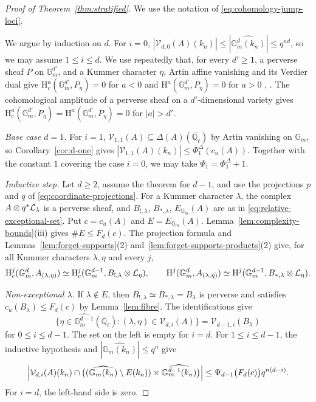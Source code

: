 \documentclass[12pt,reqno]{amsart}
\theoremstyle{definition}
\theoremstyle{plain}
\theoremstyle{definition}
\theoremstyle{remark}
\newcommand{\bbG}{\mathbb{G}}  \newcommand{\bbH}{\mathbb{H}}
\newcommand{\bbQ}{\mathbb{Q}}  \newcommand{\bbR}{\mathbb{R}}
\newcommand{\HH}{\mathrm{H}}  \newcommand{\JJ}{\mathrm{J}}
\newcommand{\ol}[1]{\overline{#1}}
\newcommand{\Ql}{\bbQ_{\ell}}
\newcommand{\Gm}{\bbG_m}
\newcommand{\cu}{c_u}
\begin{document}
\begin{proof}[Proof of Theorem~\ref{thm:stratified}]
We use the notation of \eqref{eq:cohomology-jump-loci}.

We argue by induction on \(d\).  For \(i=0\),
\(|\mathcal V_{d,0}(A)(k_n)|\le|\widehat{\Gm^d(k_n)}|\le q^{nd}\), so we may assume \(1\le i\le d\).  We use
repeatedly that, for every \(d'\ge1\), a perverse sheaf \(P\) on \(\Gm^{d'}\), and a Kummer character
\(\eta\), Artin affine vanishing and its Verdier dual give \(\HH^a_c(\Gm^{d'},P_\eta)=0\) for \(a<0\)
and \(\HH^a(\Gm^{d'},P_\eta)=0\) for \(a>0\) \cite[Th.~4.1.1, Cor.~4.1.2]{BBDG18},
\cite[Exp.~XIV, 3.1]{SGA4}.  The cohomological amplitude of a perverse sheaf on a \(d'\)-dimensional
variety gives \(\HH^a_c(\Gm^{d'},P_\eta)=\HH^a(\Gm^{d'},P_\eta)=0\) for \(|a|>d'\).

\emph{Base case \(d=1\).}  For \(i=1\),
\(\mathcal V_{1,1}(A)\subseteq\Delta(A)(\ol\Ql)\) by Artin vanishing on \(\Gm\), so
Corollary~\ref{cor:d-one} gives
\(|\mathcal V_{1,1}(A)(k_n)|\le\Phi^\Delta_{1}(\cu(A))\).
Together with the constant \(1\) covering the case \(i=0\), we may take \(\Psi_{1}=\Phi^\Delta_{1}+1\).

\emph{Inductive step.}  Let \(d\ge2\), assume the theorem for \(d-1\), and use the projections \(p\) and
\(q\) of \eqref{eq:coordinate-projections}.  For a Kummer character \(\lambda\), the complex
\(A\otimes q^*\mathcal{L}_\lambda\) is a
perverse sheaf, and \(B_{!,\lambda}\), \(B_{*,\lambda}\), \(E_{\Gm}(A)\) are as in
\eqref{eq:relative-exceptional-set}.  Put \(c=\cu(A)\) and \(E=E_{\Gm}(A)\).
Lemma~\ref{lem:complexity-bounds}(iii) gives \(\#E\le F_{d}(c)\).  The projection formula and
Lemmas~\ref{lem:forget-supports}(2) and~\ref{lem:forget-supports-products}(2) give, for all Kummer
characters \(\lambda,\eta\) and every \(j\),
\[
        \HH^j_c(\Gm^d,A_{(\lambda,\eta)})
        \simeq\HH^j_c(\Gm^{d-1},B_{!,\lambda}\otimes\cL_\eta),
        \qquad
        \HH^j(\Gm^d,A_{(\lambda,\eta)})
        \simeq\HH^j(\Gm^{d-1},B_{*,\lambda}\otimes\cL_\eta).
\]

\emph{Non-exceptional \(\lambda\).}  If \(\lambda\notin E\), then
\(B_{!,\lambda}\simeq B_{*,\lambda}=B_\lambda\) is perverse and satisfies
\(\cu(B_\lambda)\le F_{d}(c)\) by Lemma~\ref{lem:fibre}.  The identifications give
\[
 \{\eta\in\widehat{\Gm^{d-1}}(\ol\Ql):(\lambda,\eta)\in\mathcal V_{d,i}(A)\}
 =\mathcal V_{d-1,i}(B_\lambda)
\]
for \(0\le i\le d-1\).  The set on the left is empty for \(i=d\).  For \(1\le i\le d-1\), the inductive
hypothesis and \(|\widehat{\Gm(k_n)}|\le q^n\) give
\[
        \Bigl|\mathcal V_{d,i}(A)(k_n)\cap
        \bigl((\widehat{\Gm(k_n)}\setminus E(k_n))\times\widehat{\Gm^{d-1}(k_n)}\bigr)\Bigr|
        \le \Psi_{d-1}\bigl(F_{d}(c)\bigr)q^{n(d-i)}.
\]
For \(i=d\), the left-hand side is zero.


\end{proof}
\end{document}
